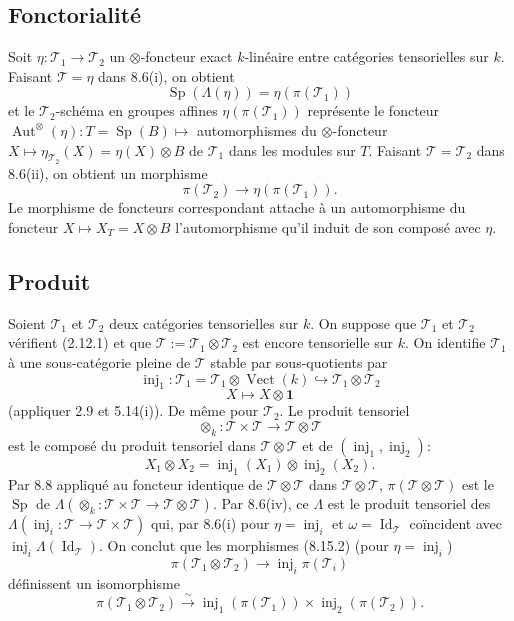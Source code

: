 \documentclass[12pt,a4paper]{article}
\theoremstyle{plain}
\theoremstyle{definition}
\DeclareMathOperator{\Sp}{Sp}
\DeclareMathOperator{\Aut}{Aut}
\DeclareMathOperator{\Id}{Id}
\DeclareMathOperator{\Vect}{Vect}
\DeclareMathOperator{\inj}{inj}
\begin{document}
\subsection{Fonctorialité}

Soit $\eta : \mathcal{T}_1 \to \mathcal{T}_2$ un $\otimes$-foncteur exact $k$-linéaire entre catégories tensorielles sur $k$. Faisant $\mathcal{T} = \eta$ dans 8.6(i), on obtient
\begin{equation}\label{eq:8.15.1}
\Sp(\Lambda(\eta)) = \eta(\pi(\mathcal{T}_1))
\end{equation}
et le $\mathcal{T}_2$-schéma en groupes affines $\eta(\pi(\mathcal{T}_1))$ représente le foncteur $\Aut^\otimes(\eta) : T = \Sp(B) \mapsto$ automorphismes du $\otimes$-foncteur $X \mapsto \eta_{\mathcal{T}_2}(X) = \eta(X) \otimes B$ de $\mathcal{T}_1$ dans les modules sur $T$. Faisant $\mathcal{T} = \mathcal{T}_2$ dans 8.6(ii), on obtient un morphisme
\begin{equation}\label{eq:8.15.2}
\pi(\mathcal{T}_2) \to \eta(\pi(\mathcal{T}_1)).
\end{equation}
Le morphisme de foncteurs correspondant attache à un automorphisme du foncteur $X \mapsto X_T = X \otimes B$ l'automorphisme qu'il induit de son composé avec $\eta$.

\subsection{Produit}

Soient $\mathcal{T}_1$ et $\mathcal{T}_2$ deux catégories tensorielles sur $k$. On suppose que $\mathcal{T}_1$ et $\mathcal{T}_2$ vérifient (2.12.1) et que $\mathcal{T} := \mathcal{T}_1 \otimes \mathcal{T}_2$ est encore tensorielle sur $k$. On identifie $\mathcal{T}_1$ à une sous-catégorie pleine de $\mathcal{T}$ stable par sous-quotients par
\[
\inj_1 : \mathcal{T}_1 = \mathcal{T}_1 \otimes \Vect(k) \hookrightarrow \mathcal{T}_1 \otimes \mathcal{T}_2
\]
\[
X \mapsto X \otimes \mathbf{1}
\]
(appliquer 2.9 et 5.14(i)). De même pour $\mathcal{T}_2$. Le produit tensoriel
\[
\otimes_k : \mathcal{T} \times \mathcal{T} \to \mathcal{T} \otimes \mathcal{T}
\]
est le composé du produit tensoriel dans $\mathcal{T} \otimes \mathcal{T}$ et de $(\inj_1, \inj_2)$:
\[
X_1 \otimes X_2 = \inj_1(X_1) \otimes \inj_2(X_2).
\]
Par 8.8 appliqué au foncteur identique de $\mathcal{T} \otimes \mathcal{T}$ dans $\mathcal{T} \otimes \mathcal{T}$, $\pi(\mathcal{T} \otimes \mathcal{T})$ est le $\Sp$ de $\Lambda(\otimes_k : \mathcal{T} \times \mathcal{T} \to \mathcal{T} \otimes \mathcal{T})$. Par 8.6(iv), ce $\Lambda$ est le produit tensoriel des $\Lambda(\inj_i : \mathcal{T} \to \mathcal{T} \times \mathcal{T})$ qui, par 8.6(i) pour $\eta = \inj_i$ et $\omega = \Id_\mathcal{T}$ coïncident avec $\inj_i \Lambda(\Id_\mathcal{T})$. On conclut que les morphismes (8.15.2) (pour $\eta = \inj_i$)
\[
\pi(\mathcal{T}_1 \otimes \mathcal{T}_2) \to \inj_i \pi(\mathcal{T}_i)
\]
définissent un isomorphisme
\begin{equation}\label{eq:8.16.1}
\pi(\mathcal{T}_1 \otimes \mathcal{T}_2) \xrightarrow{\sim} \inj_1(\pi(\mathcal{T}_1)) \times \inj_2(\pi(\mathcal{T}_2)).
\end{equation}
\end{document}
